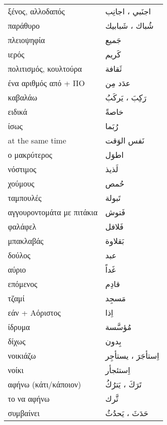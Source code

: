 \documentclass[twocolumn,a4paper]{article}
\newcommand{\ar}[1]{\textarabic{#1}}
\newcommand{\pl}{\raisebox{0.15ex}{\footnotesize ◍}}
\newcommand{\vrf}{\raisebox{0.15ex}{\footnotesize ◉}}
\newcommand{\mas}{\raisebox{0.15ex}{\footnotesize ◫}}
\begin{document}
\begin{mpsupertabular}{ P{0.5\textwidth} P{0.5\textwidth} }
ξένος, αλλοδαπός \pl         & \ar{ اجنَبي ، اجانِب } \\
παράθυρο \pl                 & \ar{ شُباك ، شَبابيك } \\
πλειοψηφία                   & \ar{ جَميع } \\
ιερός                        & \ar{ كَريم } \\
πολιτισμός, κουλτούρα        & \ar{ ثَقافة } \\
ένα αριθμός από + ΠΟ         & \ar{ عدَد مِن } \\
καβαλάω \vrf                 & \ar{ رَكِبَ ، يَركَبُ } \\ %
ειδικά                       & \ar{ خاصةً } \\
ίσως                         & \ar{ رُبَما } \\
at the same time             & \ar{ نَفس الوَقت } \\
ο μακρύτερος                 & \ar{ اطوَل } \\
νόστιμος                     & \ar{ لَذيذ } \\
χούμους                      & \ar{ حُمص } \\
ταμπουλές                    & \ar{ تَبولة } \\
αγγουροντομάτα με πιτάκια    & \ar{ فَتوش } \\
φαλάφελ                      & \ar{ فَلافل } \\
μπακλαβάς                    & \ar{ بَقلاوة } \\
δούλος                       & \ar{ عبد } \\
αύριο                        & \ar{ غَداً } \\
επόμενος                     & \ar{ قادِم } \\
τζαμί                        & \ar{ مَسجِد } \\
εάν + Αόριστος               & \ar{ اِذا } \\
ίδρυμα                       & \ar{ مُؤسَّسة } \\
δίχως                        & \ar{ بِدون } \\
νοικιάζω \vrf                & \ar{ اِستأجَرَ ، يستأجِر } \\ %
νοίκι \mas                   & \ar{ اِستئجأر } \\
αφήνω (κάτι/κάποιον) \vrf    & \ar{ تَرَكَ ، يَترُكُ } \\
το να αφήνω \mas             & \ar{ تَّرك } \\
συμβαίνει \vrf               & \ar{ حَدَثَ ، يَحدُثُ } \\ %

\end{mpsupertabular}
\end{document}
